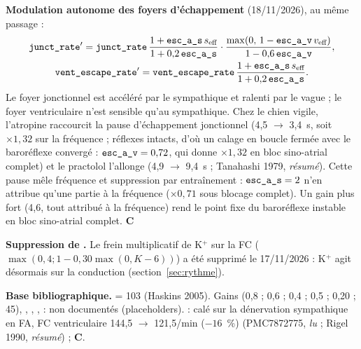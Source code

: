 \documentclass[10pt,a4paper]{article}
\newcommand{\vp}[1]{\text{\texttt{\detokenize{#1}}}}
\newcommand{\evC}{\textcolor{orange!80!black}{\textbf{C}}}
\newcommand{\acc}[1]{\textsl{#1}}
\newcommand{\sources}[1]{\par\textbf{Base bibliographique.} #1}
\begin{document}
\textbf{Modulation autonome des foyers d'échappement} (18/11/2026), au même passage :
\begin{gather}
\vp{junct_rate}' = \vp{junct_rate}\,\frac{1 + \vp{esc_a_s}\,s_\text{eff}}{1 + 0{,}2\,\vp{esc_a_s}}\cdot\frac{\max(0,\,1 - \vp{esc_a_v}\,v_\text{eff})}{1 - 0{,}6\,\vp{esc_a_v}},\\
\vp{vent_escape_rate}' = \vp{vent_escape_rate}\,\frac{1 + \vp{esc_a_s}\,s_\text{eff}}{1 + 0{,}2\,\vp{esc_a_s}}.
\end{gather}
Le foyer jonctionnel est accéléré par le sympathique et ralenti par le vague ; le foyer ventriculaire n'est sensible qu'au sympathique. Chez le chien vigile, l'atropine raccourcit la pause d'échappement jonctionnel (4,5 $\to$ 3,4~s, soit $\times 1{,}32$ sur la fréquence ; réflexes intacts, d'où un calage en boucle fermée avec le baroréflexe convergé : $\vp{esc_a_v} = 0{,}72$, qui donne $\times 1{,}32$ en bloc sino-atrial complet) et le practolol l'allonge (4,9 $\to$ 9,4~s ; Tanahashi 1979, \acc{résumé}). Cette pause mêle fréquence et suppression par entraînement : $\vp{esc_a_s} = 2$ n'en attribue qu'une partie à la fréquence ($\times 0{,}71$ sous blocage complet). Un gain plus fort (4,6, tout attribué à la fréquence) rend le point fixe du baroréflexe instable en bloc sino-atrial complet. \evC{}

\textbf{Suppression de \vp{kfac}.} Le frein multiplicatif de K$^+$ sur la FC ($\max(0{,}4; 1 - 0{,}30\max(0, K - 6))$) a été supprimé le 17/11/2026 : K$^+$ agit désormais sur la conduction (section~\ref{sec:rythme}).

\sources{\vp{map_set} = 103 (Haskins 2005). Gains (0,8 ; 0,6 ; 0,4 ; 0,5 ; 0,20 ; 45), \vp{a_s}, \vp{a_v}, \vp{s0}, \vp{v0} : non documentés (placeholders). \vp{av_symp} : calé sur la dénervation sympathique en FA, FC ventriculaire 144,5 $\to$ 121,5/min ($-16$~\%) (PMC7872775, \acc{lu} ; Rigel 1990, \acc{résumé}) ; \evC{}.}
\end{document}
